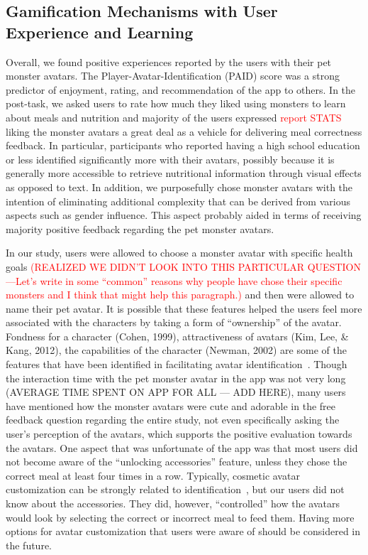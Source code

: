 \subsection{Gamification Mechanisms with User Experience and Learning}
Overall, we found positive experiences reported by the users with their pet monster avatars. The Player-Avatar-Identification (PAID) score was a strong predictor of enjoyment, rating, and recommendation of the app to others. In the post-task, we asked users to rate how much they liked using monsters to learn about meals and nutrition and majority of the users expressed \textcolor{red}{report STATS} liking the monster avatars a great deal as a vehicle for delivering meal correctness feedback. In particular, participants who reported having a high school education or less identified significantly more with their avatars, possibly because it is generally more accessible to retrieve nutritional information through visual effects as opposed to text. In addition, we purposefully chose monster avatars with the intention of eliminating additional complexity that can be derived from various aspects such as gender influence. This aspect probably aided in terms of receiving majority positive feedback regarding the pet monster avatars.  

In our study, users were allowed to choose a monster avatar with specific health goals \textcolor{red}{(REALIZED WE DIDN'T LOOK INTO THIS PARTICULAR QUESTION ---Let's write in some ``common'' reasons why people have chose their specific monsters and I think that might help this paragraph.)} and then were allowed to name their pet avatar. It is possible that these features helped the users feel more associated with the characters by taking a form of ``ownership'' of the avatar. Fondness for a character (Cohen, 1999), attractiveness of avatars (Kim, Lee, \& Kang, 2012), the capabilities of the character (Newman, 2002) are some of the features that have been identified in facilitating avatar identification~\cite{turkay2014effects}. Though the interaction time with the pet monster avatar in the app was not very long (AVERAGE TIME SPENT ON APP FOR ALL --- ADD HERE), many users have mentioned how the monster avatars were cute and adorable in the free feedback question regarding the entire study, not even specifically asking the user's perception of the avatars, which supports the positive evaluation towards the avatars. One aspect that was unfortunate of the app was that most users did not become aware of the ``unlocking accessories'' feature, unless they chose the correct meal at least four times in a row. Typically, cosmetic avatar customization can be strongly related to identification~\cite{turkay2014effects}, but our users did not know about the accessories. They did, however, ``controlled'' how the avatars would look by selecting the correct or incorrect meal to feed them. Having more options for avatar customization that users were aware of should be considered in the future. 

